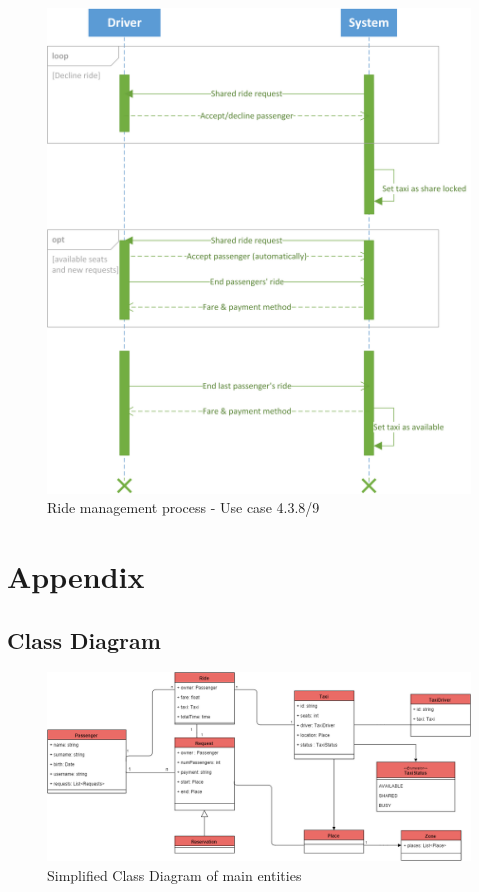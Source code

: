 \documentclass{article}
\begin{document}
        \begin{figure}[h!]
        \centering
        \includegraphics[width=1\columnwidth]{sequenceDiagram/shared-driver}
        \caption{Ride management process - Use case 4.3.8/9}
        \label{fig:seq-shdr}
    \end{figure}

\clearpage

\section{Appendix}

\subsection{Class Diagram}
\begin{figure}[h!]
        \centering
        \includegraphics[width=1\columnwidth]{classDiagram/Class-Diagram}
        \caption{Simplified Class Diagram of main entities}
        \label{fig:class-diagram}
    \end{figure}
\end{document}

